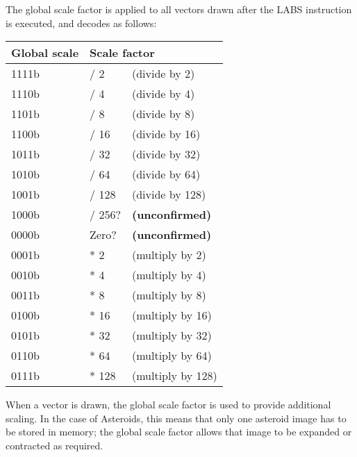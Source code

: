 \begin{minipage}{\textwidth}
The global scale factor is applied to all vectors drawn after the LABS
instruction is executed, and decodes as follows:

\begin{tabular}{|l|l l|}
	\hline
	{\bf Global scale}	&	\multicolumn{2}{l|}{\bf Scale factor}	\\ \hline
	1111b				&	/ 2				&	(divide by 2)		\\ \hline
	1110b				&	/ 4				&	(divide by 4)		\\ \hline
	1101b				&	/ 8				&	(divide by 8)		\\ \hline
	1100b				&	/ 16			&	(divide by 16)		\\ \hline
	1011b				&	/ 32			&	(divide by 32)		\\ \hline
	1010b				&	/ 64			&	(divide by 64)		\\ \hline
	1001b				&	/ 128			&	(divide by 128)		\\ \hline
	1000b				&	/ 256?			&	{\bf (unconfirmed)}	\\ \hline
	0000b				&	Zero?			&	{\bf (unconfirmed)}	\\ \hline
	0001b				&	* 2				&	(multiply by 2)		\\ \hline
	0010b				&	* 4				&	(multiply by 4)		\\ \hline
	0011b				&	* 8				&	(multiply by 8)		\\ \hline
	0100b				&	* 16			&	(multiply by 16)	\\ \hline
	0101b				&	* 32			&	(multiply by 32)	\\ \hline
	0110b				&	* 64			&	(multiply by 64)	\\ \hline
	0111b				&	* 128			&	(multiply by 128)	\\ \hline
\end{tabular}

When a vector is drawn, the global scale factor is used to provide additional
scaling. In the case of Asteroids, this means that only one asteroid image has
to be stored in memory; the global scale factor allows that image to be
expanded or contracted as required.

\vspace{1 cm}
\end{minipage}



